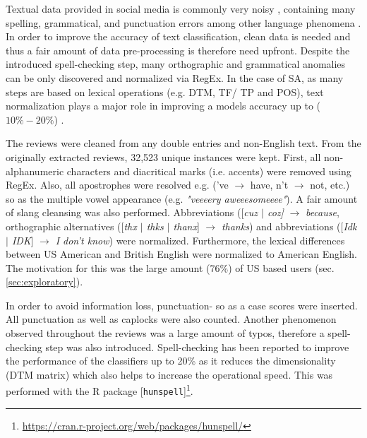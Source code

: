 \documentclass[
	a4paper,
	pdftex,
	12pt,	
	footinclude=true,
	fleqn,
	final,
	]{report}%
\begin{document}
Textual data provided in social media is commonly very noisy \cite{Liu2010},
containing many spelling, grammatical, and punctuation errors among other language phenomena \cite{Liu2012a}. 
In order to improve the accuracy of text classification, clean data 
is needed \cite{Liu2012} and thus a fair amount of data pre-processing is therefore 
need upfront. Despite the introduced spell-checking step, many orthographic and 
grammatical anomalies can be only discovered and normalized via RegEx.
In the case of SA, as many steps are based on lexical 
operations (e.g. DTM, TF/ TP and POS), text normalization plays 
a major role in improving a models accuracy up to ($10\%-20\%$) \cite{Liu2012}. 

The reviews were cleaned from any double entries and non-English text. From the 
originally extracted reviews, 
32,523 unique instances were kept. First, all non-alphanumeric characters and 
diacritical marks (i.e. accents) were removed using RegEx.
Also, all apostrophes were resolved e.g. ('ve $\rightarrow$ have, n't $\rightarrow$ not, etc.) so as
the multiple vowel appearance (e.g. \emph{"veeeery aweeesomeeee"}). A fair amount of slang cleansing was also performed. 
Abbreviations ([\emph{cuz $\lvert$ coz]} $\rightarrow$ \emph{because}, orthographic alternatives
([\emph{thx $\lvert$ thks $\lvert$ thanx}] $\rightarrow$ \emph{thanks}) and abbreviations 
([\emph{Idk $\lvert$ IDK}] $\rightarrow$ \emph{I don't know}) were normalized. 
Furthermore, the lexical differences between US American and British English 
were normalized to American English. The motivation for this was the
large amount (76\%) of US based users (sec.\ref{sec:exploratory}).

In order to avoid information loss, punctuation- so as a case scores were inserted. 
All punctuation as well as caplocks were also counted. Another phenomenon 
observed throughout the reviews was a large amount of typos, therefore a spell-checking 
step was also introduced. Spell-checking has been reported to improve the performance of the classifiers up to 20\% \cite{Fang2015} 
as it reduces the dimensionality (DTM matrix) which also helps to increase the operational speed.
This was performed with the R package [\texttt{hunspell}]\footnote{\url{https://cran.r-project.org/web/packages/hunspell/}}.
\end{document}
